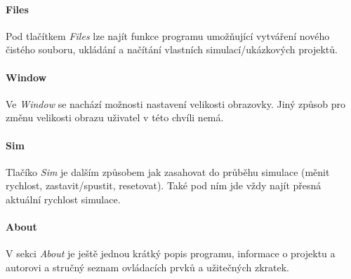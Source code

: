 \documentclass[a4paper, 12pt]{article}
\begin{document}
\paragraph{Files}
Pod tlačítkem \emph{Files} lze najít funkce programu umožňující vytváření nového
čistého souboru, ukládání a načítání vlastních simulací/ukázkových projektů.

\paragraph{Window}
Ve \emph{Window} se nachází možnosti nastavení velikosti obrazovky. Jiný způsob
pro změnu velikosti obrazu uživatel v této chvíli nemá.

\paragraph{Sim}
Tlačíko \emph{Sim} je dalším způsobem jak zasahovat do průběhu simulace (měnit
rychlost, zastavit/spustit, resetovat). Také pod ním jde vždy najít přesná
aktuální rychlost simulace.

\paragraph{About}
V sekci \emph{About} je ještě jednou krátký popis programu, informace o
projektu a autorovi a stručný seznam ovládacích prvků a užitečných zkratek.

\pagebreak
\end{document}
